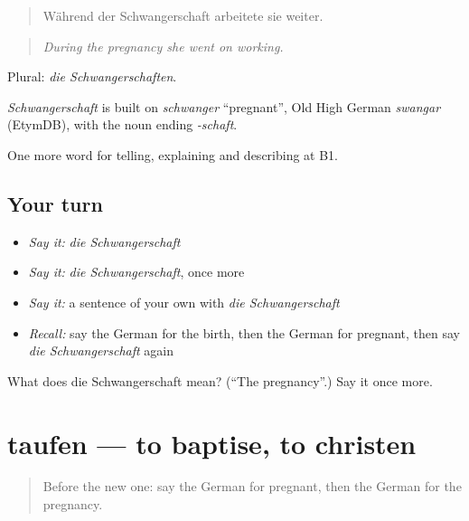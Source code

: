 \begin{quote}
Während der Schwangerschaft arbeitete sie weiter.
\end{quote}

\begin{quote}
\emph{During the pregnancy she went on working.}
\end{quote}

Plural: \emph{die Schwangerschaften}.

\begin{cousinweb}
\emph{Schwangerschaft} is built on \emph{schwanger} \textquotedblleft{}pregnant\textquotedblright{}, Old High German \emph{swangar} (EtymDB), with the noun ending \emph{-schaft}.
\end{cousinweb}

\begin{grammarlens}[title={What you've built}]
One more word for telling, explaining and describing at B1.
\end{grammarlens}

\subsection*{Your turn}
\begin{itemize}
\raggedright
  \item \emph{Say it:} \emph{die Schwangerschaft}
  \item \emph{Say it:} \emph{die Schwangerschaft}, once more
  \item \emph{Say it:} a sentence of your own with \emph{die Schwangerschaft}
  \item \emph{Recall:} say the German for the birth, then the German for pregnant, then say \emph{die Schwangerschaft} again
\end{itemize}

\begin{tcolorbox}[breakable,colback=teal!4,colframe=teal!35!black,title={Before you move on}]
What does die Schwangerschaft mean? (\textquotedblleft{}The pregnancy\textquotedblright{}.) Say it once more.
\end{tcolorbox}
\section[taufen]{taufen — to baptise, to christen}

\label{lesson:GE-C296-taufen}



\begin{quote}
Before the new one: say the German for pregnant, then the German for the pregnancy.
\end{quote}

